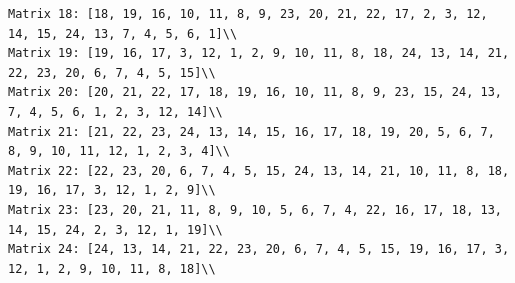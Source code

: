 \documentclass{article}
\begin{document}
\begin{scriptsize}
\begin{verbatim}
Matrix 18: [18, 19, 16, 10, 11, 8, 9, 23, 20, 21, 22, 17, 2, 3, 12, 14, 15, 24, 13, 7, 4, 5, 6, 1]\\
Matrix 19: [19, 16, 17, 3, 12, 1, 2, 9, 10, 11, 8, 18, 24, 13, 14, 21, 22, 23, 20, 6, 7, 4, 5, 15]\\
Matrix 20: [20, 21, 22, 17, 18, 19, 16, 10, 11, 8, 9, 23, 15, 24, 13, 7, 4, 5, 6, 1, 2, 3, 12, 14]\\
Matrix 21: [21, 22, 23, 24, 13, 14, 15, 16, 17, 18, 19, 20, 5, 6, 7, 8, 9, 10, 11, 12, 1, 2, 3, 4]\\
Matrix 22: [22, 23, 20, 6, 7, 4, 5, 15, 24, 13, 14, 21, 10, 11, 8, 18, 19, 16, 17, 3, 12, 1, 2, 9]\\
Matrix 23: [23, 20, 21, 11, 8, 9, 10, 5, 6, 7, 4, 22, 16, 17, 18, 13, 14, 15, 24, 2, 3, 12, 1, 19]\\
Matrix 24: [24, 13, 14, 21, 22, 23, 20, 6, 7, 4, 5, 15, 19, 16, 17, 3, 12, 1, 2, 9, 10, 11, 8, 18]\\
\end{verbatim}
\end{scriptsize}
\end{document}
